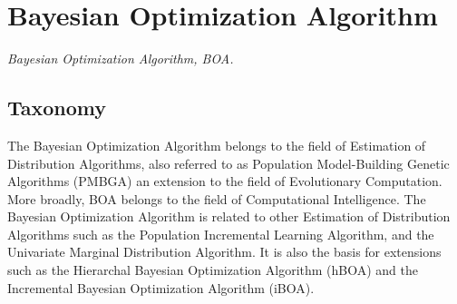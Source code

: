 

\section{Bayesian Optimization Algorithm} 
\label{sec:boa}

\emph{Bayesian Optimization Algorithm, BOA.}

\subsection{Taxonomy}
The Bayesian Optimization Algorithm belongs to the field of Estimation of Distribution Algorithms, also referred to as Population Model-Building Genetic Algorithms (PMBGA) an extension to the field of Evolutionary Computation. More broadly, BOA belongs to the field of Computational Intelligence.
The Bayesian Optimization Algorithm is related to other Estimation of Distribution Algorithms such as the Population Incremental Learning Algorithm, and the Univariate Marginal Distribution Algorithm.
It is also the basis for extensions such as the Hierarchal Bayesian Optimization Algorithm (hBOA) and the Incremental Bayesian Optimization Algorithm (iBOA).


